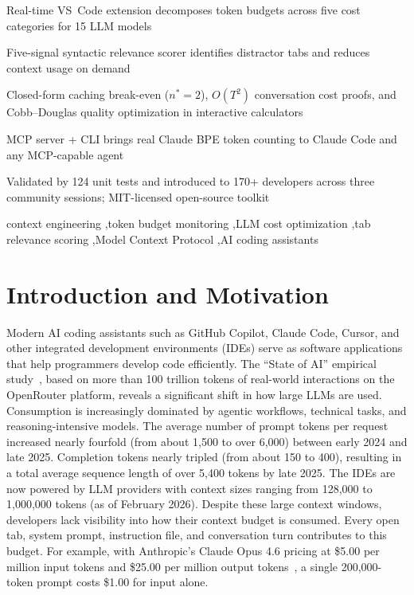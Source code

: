 \documentclass[a4paper,fleqn]{cas-dc}
\begin{document}
\begin{highlights}
\item Real-time VS~Code extension decomposes token budgets across five cost categories for 15 LLM models
\item Five-signal syntactic relevance scorer identifies distractor tabs and reduces context usage on demand
\item Closed-form caching break-even ($n^*=2$), $O(T^2)$ conversation cost proofs, and Cobb--Douglas quality optimization in interactive calculators
\item MCP server + CLI brings real Claude BPE token counting to Claude Code and any MCP-capable agent
\item Validated by 124 unit tests and introduced to 170+ developers across three community sessions; MIT-licensed open-source toolkit
\end{highlights}

\begin{keywords}
context engineering \sep token budget monitoring \sep LLM cost optimization \sep tab relevance scoring \sep Model Context Protocol \sep AI coding assistants
\end{keywords}

\maketitle


\section{Introduction and Motivation}

Modern AI coding assistants such as GitHub Copilot, Claude Code, Cursor, and other integrated development environments (IDEs) serve as software applications that help programmers develop code efficiently. The ``State of AI'' empirical study~\cite{aubakirova2025state}, based on more than 100 trillion tokens of real-world interactions on the OpenRouter platform, reveals a significant shift in how large LLMs are used. Consumption is increasingly dominated by agentic workflows, technical tasks, and reasoning-intensive models. The average number of prompt tokens per request increased nearly fourfold (from about 1,500 to over 6,000) between early 2024 and late 2025. Completion tokens nearly tripled (from about 150 to 400), resulting in a total average sequence length of over 5,400 tokens by late 2025. The IDEs are now powered by LLM providers with context sizes ranging from 128,000 to 1,000,000 tokens (as of February 2026). Despite these large context windows, developers lack visibility into how their context budget is consumed. Every open tab, system prompt, instruction file, and conversation turn contributes to this budget. For example, with Anthropic's Claude Opus 4.6 pricing at \$5.00 per million input tokens and \$25.00 per million output tokens~\cite{anthropic2026pricing}, a single 200,000-token prompt costs \$1.00 for input alone.
\end{document}
